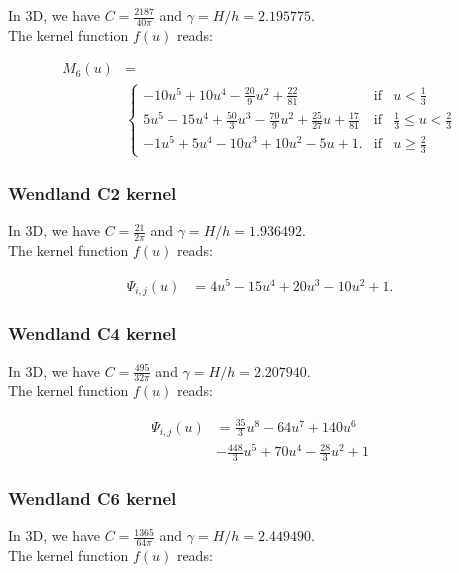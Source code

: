 \documentclass[usenatbib, useAMS,a4paper]{mnras}
\begin{document}
In 3D, we have $C=\frac{2187}{40\pi}$ and $\gamma=H/h = 2.195775$.\\
The kernel function $f(u)$ reads:

\begin{align}
  M_6(u) &=     \nonumber\\
  &\left\lbrace\begin{array}{rcl}
  -10u^5 + 10u^4 - \frac{20}{9}u^2 + \frac{22}{81} & \mbox{if} & u < \frac{1}{3} \\
  5u^5 - 15u^4 + \frac{50}{3}u^3 - \frac{70}{9}u^2 + \frac{25}{27}u + \frac{17}{81} &  \mbox{if} &  \frac{1}{3} \leq u < \frac{2}{3}\\
  -1u^5 + 5u^4 - 10u^3 + 10u^2 - 5u + 1. & \mbox{if} & u \geq \frac{2}{3}
  \end{array}
  \right.
      \nonumber
\end{align}


\subsubsection{Wendland C2 kernel}

In 3D, we have $C=\frac{21}{2\pi}$ and $\gamma=H/h = 1.936492$.\\
The kernel function $f(u)$ reads:

\begin{align}
  \Psi_{i,j}(u) &= 4u^5 - 15u^4 + 20u^3 - 10u^2 + 1.
    \nonumber
\end{align}


\subsubsection{Wendland C4 kernel}

In 3D, we have $C=\frac{495}{32\pi}$ and $\gamma=H/h = 2.207940$.\\
The kernel function $f(u)$ reads:

\begin{align}
  \Psi_{i,j}(u) &= \frac{35}{3}u^8 - 64u^7 + 140u^6     \nonumber\\
  & - \frac{448}{3}u^5 + 70u^4 - \frac{28}{3}u^2 + 1
    \nonumber
\end{align}


\subsubsection{Wendland C6 kernel}

In 3D, we have $C=\frac{1365}{64\pi}$ and $\gamma=H/h = 2.449490$.\\
The kernel function $f(u)$ reads:
\end{document}
